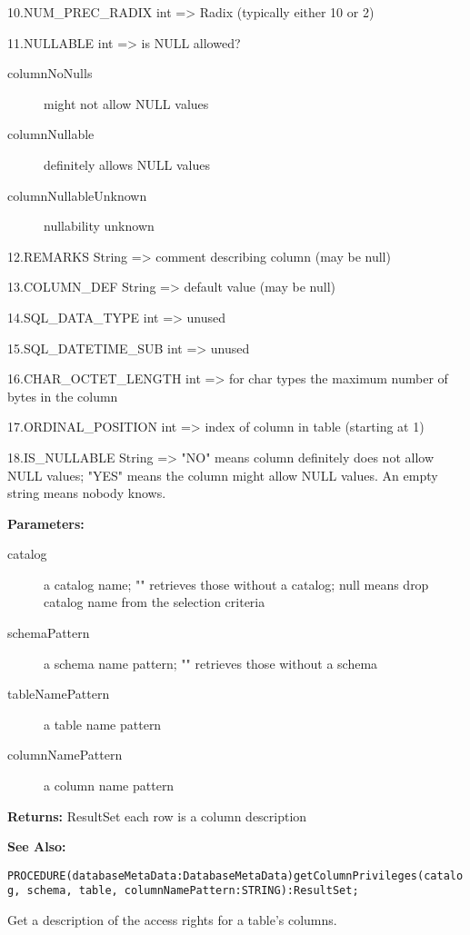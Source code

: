 10.NUM\_PREC\_RADIX int => Radix (typically either 10 or 2) 

11.NULLABLE int => is NULL allowed? 
\begin{description}
\item[columnNoNulls] might not allow NULL values 
\item[columnNullable] definitely allows NULL values 
\item[columnNullableUnknown] nullability unknown 
\end{description}

12.REMARKS String => comment describing column (may be null) 

13.COLUMN\_DEF String => default value (may be null) 

14.SQL\_DATA\_TYPE int => unused 

15.SQL\_DATETIME\_SUB int => unused 

16.CHAR\_OCTET\_LENGTH int => for char types the maximum number of bytes in the column 

17.ORDINAL\_POSITION int => index of column in table (starting at 1) 

18.IS\_NULLABLE String => "NO" means column definitely does not allow NULL values; "YES" means the column might allow NULL values. An empty string means nobody knows. 


{\bf Parameters: }
\begin{description}
\item[catalog] a catalog name; "" retrieves those without a catalog; null means drop catalog name from the selection criteria 
\item[schemaPattern] a schema name pattern; "" retrieves those without a schema 
\item[tableNamePattern] a table name pattern 
\item[columnNamePattern] a column name pattern 
\end{description}

{\bf Returns: } 
ResultSet each row is a column description 

{\bf See Also:} 




\verb'PROCEDURE(databaseMetaData:DatabaseMetaData)getColumnPrivileges(catalog, schema, table, columnNamePattern:STRING):ResultSet;'





Get a description of the access rights for a table's columns. 

